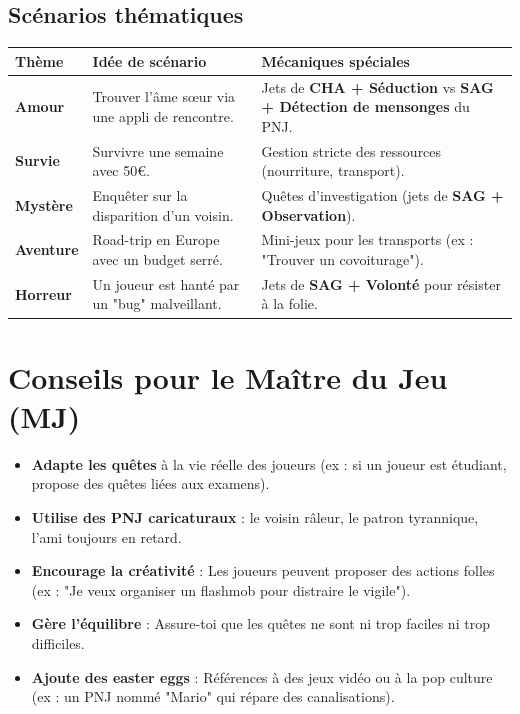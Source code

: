 \documentclass[11pt, a4paper]{article}
\begin{document}
\subsection{Scénarios thématiques}
\begin{center}
    \begin{tabular}{|>{\bfseries}l|p{6cm}|p{5cm}|}
        \hline
        \textbf{Thème} & \textbf{Idée de scénario} & \textbf{Mécaniques spéciales}  	\\
        \hline
        Amour & Trouver l'âme sœur via une appli de rencontre. & Jets de \textbf{CHA + Séduction} vs \textbf{SAG + Détection de mensonges} du PNJ.  	\\
        \hline
        Survie & Survivre une semaine avec 50€. & Gestion stricte des ressources (nourriture, transport).  	\\
        \hline
        Mystère & Enquêter sur la disparition d'un voisin. & Quêtes d'investigation (jets de \textbf{SAG + Observation}).  	\\
        \hline
        Aventure & Road-trip en Europe avec un budget serré. & Mini-jeux pour les transports (ex : "Trouver un covoiturage").  	\\
        \hline
        Horreur & Un joueur est hanté par un "bug" malveillant. & Jets de \textbf{SAG + Volonté} pour résister à la folie.  	\\
        \hline
    \end{tabular}
\end{center}

\newpage
\section{Conseils pour le Maître du Jeu (MJ)}
\begin{itemize}
    \item \textbf{Adapte les quêtes} à la vie réelle des joueurs (ex : si un joueur est étudiant, propose des quêtes liées aux examens).
    \item \textbf{Utilise des PNJ caricaturaux} : le voisin râleur, le patron tyrannique, l'ami toujours en retard.
    \item \textbf{Encourage la créativité} : Les joueurs peuvent proposer des actions folles (ex : "Je veux organiser un flashmob pour distraire le vigile").
    \item \textbf{Gère l'équilibre} : Assure-toi que les quêtes ne sont ni trop faciles ni trop difficiles.
    \item \textbf{Ajoute des easter eggs} : Références à des jeux vidéo ou à la pop culture (ex : un PNJ nommé "Mario" qui répare des canalisations).
\end{itemize}
\end{document}
